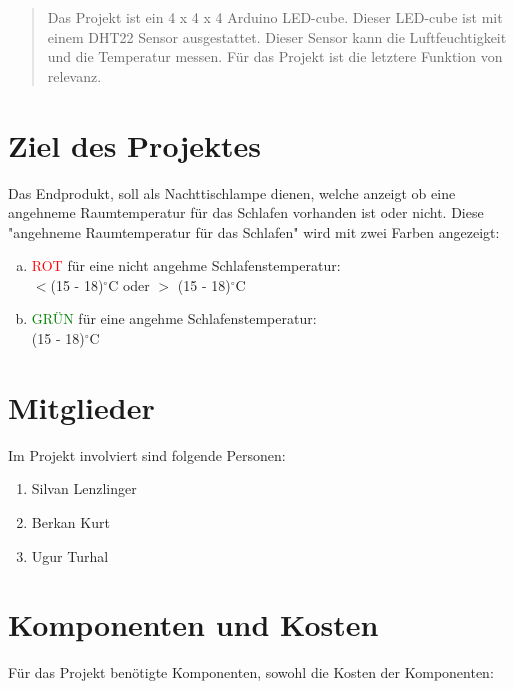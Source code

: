 \documentclass{paper}
\begin{document}
\pagestyle{fancy}
\fancyhead[C]{}                       
\begin{abstract}
\noindent Das Projekt ist ein 4 x 4 x 4 Arduino LED-cube. Dieser LED-cube ist mit einem DHT22 Sensor ausgestattet. Dieser Sensor kann die Luftfeuchtigkeit und die Temperatur messen. Für das Projekt ist die letztere Funktion von relevanz.
\end{abstract}

\section*{Ziel des Projektes} Das Endprodukt, soll als Nachttischlampe dienen, welche anzeigt ob eine angehneme Raumtemperatur für das Schlafen vorhanden ist oder nicht. Diese "angehneme Raumtemperatur für das Schlafen" wird mit zwei Farben angezeigt:\begin{enumerate}[(a)]
\item \textcolor{red}{ROT} für eine nicht angehme Schlafenstemperatur:\\ $<$(15 - 18)$^{\circ}$C oder $>$ (15 - 18)$^{\circ}$C  
\item \textcolor{green}{GRÜN} für eine angehme Schlafenstemperatur:\\ (15 - 18)$^{\circ}$C 
\end{enumerate}
\section*{Mitglieder}
Im Projekt involviert sind folgende Personen: 
\begin{enumerate}[(1)]
\item Silvan Lenzlinger
\item Berkan Kurt 
\item Ugur Turhal
\end{enumerate}
\section*{Komponenten und Kosten}
Für das Projekt benötigte Komponenten, sowohl die Kosten der Komponenten:
\end{document}
